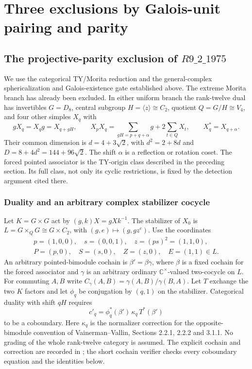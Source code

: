 \section{Three exclusions by Galois-unit pairing and parity}
\label{sec:galois-pairing-20261027}
\subsection{The projective-parity exclusion of $R9\_2\_1975$}
We use the categorical TY/Morita reduction and the general-complex
sphericalization and Galois-existence gate established above. The extreme
Morita branch has already been excluded. In either uniform branch the
rank-twelve dual has invertibles $G=D_8$, central subgroup $H=\langle z\rangle
\cong C_2$, quotient $Q=G/H\cong V_4$, and four other simples $X_q$ with
\[
 gX_q=X_qg=X_{q+gH},\qquad
 X_pX_q=\sum_{gH=p+q+\alpha}g+2\sum_{t\in Q}X_t,
 \qquad X_q^*=X_{q+\alpha}.
\]
Their common dimension is $d=4+3\sqrt2$, with $d^2=2+8d$ and
$D=8+4d^2=144+96\sqrt2$. The shift $\alpha$ is a reflection or rotation
coset. The forced pointed associator is the TY-origin class described in
the preceding section. Its full class, not only its cyclic restrictions,
is fixed by the detection argument cited there.

\subsubsection{Duality and an arbitrary complex stabilizer cocycle}
Let $K=G\times G$ act by $(g,k)X=gXk^{-1}$. The stabilizer of $X_0$ is
$L=G\times_QG\cong G\times C_2$, with $(g,e)\mapsto(g,gz^e)$.
Use the coordinates
\[
 \begin{gathered}
 p=(1,0,0),\quad s=(0,0,1),\quad z=(ps)^2=(1,1,0),\\
 P=(p,0),\quad S=(s,0),\quad Z=(z,0),\quad E=(1,1)\in L.
 \end{gathered}
\]
An arbitrary pointed-bimodule cochain is $\beta'=\beta\gamma$, where
$\beta$ is a fixed cochain for the forced associator and $\gamma$ is an
arbitrary ordinary $\mathbb C^\times$-valued two-cocycle on $L$.
For commuting $A,B$ write
$C_\gamma(A,B)=\gamma(A,B)/\gamma(B,A)$.
Let $T$ exchange the two $K$ factors and let $\phi_q$ be conjugation
by $(q,1)$ on the stabilizer. Categorical duality with shift $qH$ requires
\[
 c'_q=\phi_q^*(\beta')\,\kappa_q\,T^*(\beta')
\]
to be a coboundary. Here $\kappa_q$ is the normalizer correction for the
opposite-bimodule convention of Vainerman--Vallin, Sections 2.2.1, 2.2.2
and 3.1.1. No grading of the whole rank-twelve category is assumed.
The explicit cochain and correction are recorded in
; the short
cochain verifier checks every coboundary equation and the identities below.

